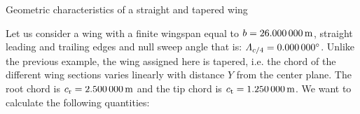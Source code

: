 \documentclass[[12pt,twoside]{book}
\begin{document}
\begin{myExampleX}{Geometric characteristics of a straight and tapered wing}{}%
\label{example:Geometric:Characteristics:Of:A:Straight:And:Tapered:Wing}
%

Let us consider a wing with a finite wingspan equal to $b=\SI[round-precision=1]{\mySpanWingMT}{\metre}$,
straight leading and trailing edges and null sweep angle that is: $\Lambda_{c/4}=\SI[round-precision=0]{\myLambdaCQuarterDeg}{\degree}$.
Unlike the previous example, the wing assigned here is tapered, i.e.
the chord of the different wing sections varies linearly with distance $Y$ from the center plane. The root chord is
$c_\mathrm{r}=\SI[round-precision=2]{\myChordRootWingMT}{\metre}$ and the tip chord is $c_\mathrm{t}=\SI[round-precision=2]{\myChordTipWingMT}{\metre}$.
We want to calculate the following quantities:

\medskip


\end{myExampleX}
\end{document}
